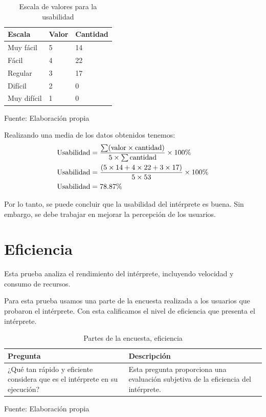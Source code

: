 \begin{table}[!h]
  \begin{center}
    \begin{tabularx}{0.9\textwidth}{|X|X|X|}
      \hline
      \textbf{Escala} & \textbf{Valor} & \textbf{Cantidad} \\
      \hline
      Muy fácil & 5 & 14 \\
      \hline
      Fácil & 4 & 22 \\
      \hline
      Regular & 3 & 17 \\
      \hline
      Difícil & 2 & 0 \\
      \hline
      Muy difícil & 1 & 0 \\
      \hline
    \end{tabularx}
  \end{center}
  \caption{Escala de valores para la usabilidad}
  \centering Fuente: Elaboración propia
  \label{tab:usabilidad-escala}
\end{table}

Realizando una media de los datos obtenidos tenemos:
\begin{equation*}
  \begin{split}
    \textnormal{Usabilidad} & = \frac{\sum (\textnormal{valor} \times \textnormal{cantidad})}{5 \times \sum \textnormal{cantidad}} \times 100\% \\
    \textnormal{Usabilidad} & = \frac{(5 \times 14 + 4 \times 22 + 3 \times 17)}{5 \times 53} \times 100\% \\
    \textnormal{Usabilidad} & = 78.87\%
  \end{split}
\end{equation*}

Por lo tanto, se puede concluir que la usabilidad del intérprete es buena. Sin embargo, se debe trabajar en mejorar la percepción de los usuarios.

\section{Eficiencia}
Esta prueba analiza el rendimiento del intérprete, incluyendo velocidad y consumo de recursos.

Para esta prueba usamos una parte de la encuesta realizada a los usuarios que probaron el intérprete. Con esta calificamos el nivel de eficiencia que presenta el intérprete.
\begin{table}[!h]
  \begin{center}
    \begin{tabularx}{0.9\textwidth}{|X|X|}
      \hline
      \textbf{Pregunta} & \textbf{Descripción} \\
      \hline
      ¿Qué tan rápido y eficiente considera que es el intérprete en su ejecución? & Esta pregunta proporciona una evaluación subjetiva de la eficiencia del intérprete. \\
      \hline
    \end{tabularx}
  \end{center}
  \caption{Partes de la encuesta, eficiencia}
  \centering Fuente: Elaboración propia
  \label{tab:eficiencia}
\end{table}

